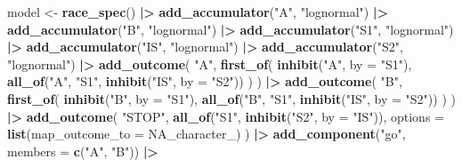 \documentclass[
]{article}
\newenvironment{Shaded}{\begin{snugshade}}{\end{snugshade}}
\newcommand{\AttributeTok}[1]{\textcolor[rgb]{0.13,0.29,0.53}{#1}}
\newcommand{\ConstantTok}[1]{\textcolor[rgb]{0.56,0.35,0.01}{#1}}
\newcommand{\FunctionTok}[1]{\textcolor[rgb]{0.13,0.29,0.53}{\textbf{#1}}}
\newcommand{\NormalTok}[1]{#1}
\newcommand{\OtherTok}[1]{\textcolor[rgb]{0.56,0.35,0.01}{#1}}
\newcommand{\SpecialCharTok}[1]{\textcolor[rgb]{0.81,0.36,0.00}{\textbf{#1}}}
\newcommand{\StringTok}[1]{\textcolor[rgb]{0.31,0.60,0.02}{#1}}
\begin{document}
\begin{Shaded}
\begin{Highlighting}[]
\NormalTok{model }\OtherTok{\textless{}{-}} \FunctionTok{race\_spec}\NormalTok{() }\SpecialCharTok{|\textgreater{}}
  \FunctionTok{add\_accumulator}\NormalTok{(}\StringTok{"A"}\NormalTok{, }\StringTok{"lognormal"}\NormalTok{) }\SpecialCharTok{|\textgreater{}}
  \FunctionTok{add\_accumulator}\NormalTok{(}\StringTok{"B"}\NormalTok{, }\StringTok{"lognormal"}\NormalTok{) }\SpecialCharTok{|\textgreater{}}
  \FunctionTok{add\_accumulator}\NormalTok{(}\StringTok{"S1"}\NormalTok{, }\StringTok{"lognormal"}\NormalTok{) }\SpecialCharTok{|\textgreater{}}
  \FunctionTok{add\_accumulator}\NormalTok{(}\StringTok{"IS"}\NormalTok{, }\StringTok{"lognormal"}\NormalTok{) }\SpecialCharTok{|\textgreater{}}
  \FunctionTok{add\_accumulator}\NormalTok{(}\StringTok{"S2"}\NormalTok{, }\StringTok{"lognormal"}\NormalTok{) }\SpecialCharTok{|\textgreater{}}
  \FunctionTok{add\_outcome}\NormalTok{(}
    \StringTok{"A"}\NormalTok{,}
    \FunctionTok{first\_of}\NormalTok{(}
      \FunctionTok{inhibit}\NormalTok{(}\StringTok{"A"}\NormalTok{, }\AttributeTok{by =} \StringTok{"S1"}\NormalTok{),}
      \FunctionTok{all\_of}\NormalTok{(}\StringTok{"A"}\NormalTok{, }\StringTok{"S1"}\NormalTok{, }\FunctionTok{inhibit}\NormalTok{(}\StringTok{"IS"}\NormalTok{, }\AttributeTok{by =} \StringTok{"S2"}\NormalTok{))}
\NormalTok{    )}
\NormalTok{  ) }\SpecialCharTok{|\textgreater{}}
  \FunctionTok{add\_outcome}\NormalTok{(}
    \StringTok{"B"}\NormalTok{,}
    \FunctionTok{first\_of}\NormalTok{(}
      \FunctionTok{inhibit}\NormalTok{(}\StringTok{"B"}\NormalTok{, }\AttributeTok{by =} \StringTok{"S1"}\NormalTok{),}
      \FunctionTok{all\_of}\NormalTok{(}\StringTok{"B"}\NormalTok{, }\StringTok{"S1"}\NormalTok{, }\FunctionTok{inhibit}\NormalTok{(}\StringTok{"IS"}\NormalTok{, }\AttributeTok{by =} \StringTok{"S2"}\NormalTok{))}
\NormalTok{    )}
\NormalTok{  ) }\SpecialCharTok{|\textgreater{}}
  \FunctionTok{add\_outcome}\NormalTok{(}
    \StringTok{"STOP"}\NormalTok{,}
    \FunctionTok{all\_of}\NormalTok{(}\StringTok{"S1"}\NormalTok{, }\FunctionTok{inhibit}\NormalTok{(}\StringTok{"S2"}\NormalTok{, }\AttributeTok{by =} \StringTok{"IS"}\NormalTok{)),}
    \AttributeTok{options =} \FunctionTok{list}\NormalTok{(}\AttributeTok{map\_outcome\_to =} \ConstantTok{NA\_character\_}\NormalTok{)}
\NormalTok{  ) }\SpecialCharTok{|\textgreater{}}
  \FunctionTok{add\_component}\NormalTok{(}\StringTok{"go"}\NormalTok{, }\AttributeTok{members =} \FunctionTok{c}\NormalTok{(}\StringTok{"A"}\NormalTok{, }\StringTok{"B"}\NormalTok{)) }\SpecialCharTok{|\textgreater{}}

\end{Highlighting}
\end{Shaded}
\end{document}
